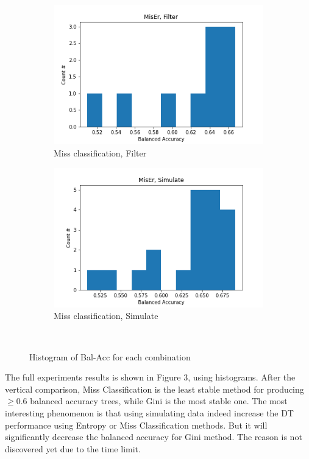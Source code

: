 \documentclass{article}
\begin{document}
\begin{figure}[H]
  \begin{subfigure}[t]{.45\linewidth}
    \centering\includegraphics[width=1\linewidth]{Fig/MisEr, Filter.png}
    \caption{Miss classification, Filter}
  \end{subfigure}
  \begin{subfigure}[t]{.45\linewidth}
    \centering\includegraphics[width=1\linewidth]{Fig/MisEr, Simulate.png}
    \caption{Miss classification, Simulate}
  \end{subfigure}\\
  
  \caption{Histogram of Bal-Acc for each combination}
\end{figure}
The full experiments results is shown in Figure 3, using histograms. After the vertical comparison, Miss Classification is the least stable method for producing $\geq$0.6 balanced accuracy  trees, while Gini is the most stable one. The most interesting phenomenon is that using simulating data indeed increase the DT performance using Entropy or Miss Classification methods. But it will significantly decrease the balanced accuracy for Gini method. The reason is not discovered yet due to the time limit. \\\\
\end{document}
